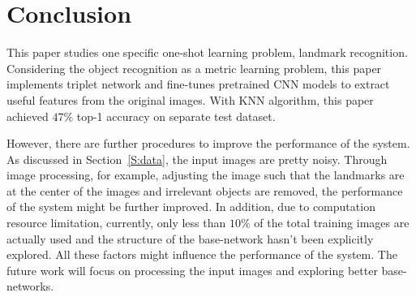 \documentclass[final,3p]{elsarticle}
\begin{document}
\section{Conclusion}
\label{S:conclusion}

This paper studies one specific one-shot learning problem, landmark recognition. Considering the object recognition as a metric learning problem, this paper implements triplet network and fine-tunes pretrained CNN models to extract useful features from the original images. With KNN algorithm, this paper achieved $47\%$ top-1 accuracy on separate test dataset.

However, there are further procedures to improve the performance of the system. As discussed in Section~\ref{S:data}, the input images are pretty noisy. Through image processing, for example, adjusting the image such that the landmarks are at the center of the images and irrelevant objects are removed, the performance of the system might be further improved. In addition, due to computation resource limitation, currently, only less than $10\%$ of the total training images are actually used and the structure of the base-network hasn't been explicitly explored. All these factors might influence the performance of the system. The future work will focus on processing the input images and exploring better base-networks.

%


\section{\refname}


\end{document}
